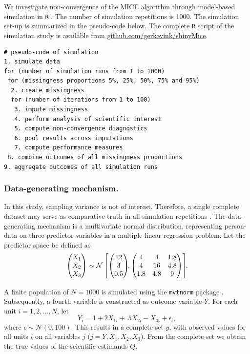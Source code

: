 \documentclass[Royal,times,sageh]{sagej}
\begin{document}
We investigate non-convergence of the MICE algorithm through model-based simulation in \texttt{R} \citep[version 3.6.3;][]{R}. The number of simulation repetitions is 1000. The simulation set-up is summarized in the pseudo-code below. The complete \texttt{R} script of the simulation study is available from \href{https://github.com/gerkovink/shinyMice/tree/master/3.Thesis/}{github.com/gerkovink/shinyMice}.

\begin{verbatim}
# pseudo-code of simulation 
1. simulate data 
for (number of simulation runs from 1 to 1000)
 for (missingness proportions 5%, 25%, 50%, 75% and 95%)
  2. create missingness
  for (number of iterations from 1 to 100)
   3. impute missingness
   4. perform analysis of scientific interest
   5. compute non-convergence diagnostics 
   6. pool results across imputations
   7. compute performance measures
 8. combine outcomes of all missingness proportions
9. aggregate outcomes of all simulation runs 
\end{verbatim}

\hypertarget{data-generating-mechanism.}{%
\subsubsection{Data-generating mechanism.}\label{data-generating-mechanism.}}

In this study, sampling variance is not of interest. Therefore, a single complete dataset may serve as comparative truth in all simulation repetitions \citep{vink14}. The data-generating mechanism is a multivariate normal distribution, representing person-data on three predictor variables in a multiple linear regression problem. Let the predictor space be defined as
\[
\begin{aligned}
\begin{pmatrix}X_1\\
X_2\\
X_3
\end{pmatrix} \sim \mathcal{N}
\begin{bmatrix}
\begin{pmatrix}
12\\
3\\
0.5
\end{pmatrix}\!\!,
\begin{pmatrix}
4 & 4 & 1.8 \\
4 & 16 & 4.8\\
1.8 & 4.8 & 9
\end{pmatrix}
\end{bmatrix}\!\!\text{.}\\[2\jot]
\end{aligned}
\]
A finite population of \(N=1000\) is simulated using the \texttt{mvtnorm} package \citep{mvtnorm}. Subsequently, a fourth variable is constructed as outcome variable \(Y\). For each unit \(i = 1, 2,..., N\), let
\[
Y_i = 1 + 2X_{1i} +.5X_{2i} - X_{3i} + \epsilon_i ,
\]
where \(\epsilon \sim \mathcal{N}(0, 100)\). This results in a complete set \(y\), with observed values for all units \(i\) on all variables \(j\) (\(j = Y, X_1, X_2, X_3\)). From the complete set we obtain the true values of the scientific estimands \(Q\).
\end{document}

